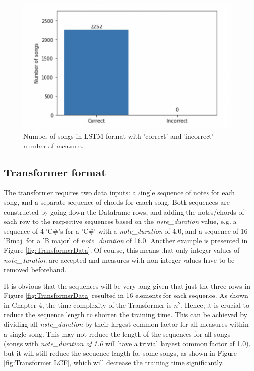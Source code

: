 \begin{figure}
    \centering
    \includegraphics{Figures/LSTM check}
    \decoRule
    \caption{Number of songs in LSTM format with 'correct' and 'incorrect' number of measures.}
    \label{fig:LSTM check}
    \end{figure}

\subsection{Transformer format}
The transformer requires two data inputs: a single sequence of notes for each song, and a separate sequence of chords for eaach song. Both sequences are constructed by going down the Dataframe rows, and adding the notes/chords of each row to the respective sequences based on the \emph{note\_duration} value, e.g. a sequence of 4 'C\#'s for a 'C\#' with a \emph{note\_duration} of 4.0, and a sequence of 16 'Bmaj' for a 'B major' of \emph{note\_duration} of 16.0. Another example is presented in Figure \ref{fig:TransformerData}. Of course, this means that only integer values of \emph{note\_duration} are accepted and measures with non-integer values have to be removed beforehand.

It is obvious that the sequences will be very long given that just the three rows in Figure \ref{fig:TransformerData} resulted in 16 elements for each sequence. As shown in Chapter 4, the time complexity of the Transformer is ${n}^2$. Hence, it is crucial to reduce the sequence length to shorten the training time. This can be achieved by dividing all \emph{note\_duration} by their largest common factor for all measures within a single song. This may not reduce the length of the sequences for all songs (songs with \emph{note\_duration of 1.0} will have a trivial largest common factor of 1.0), but it will still reduce the sequence length for some songs, as shown in Figure \ref{fig:Transformer LCF}, which will decrease the training time significantly.


